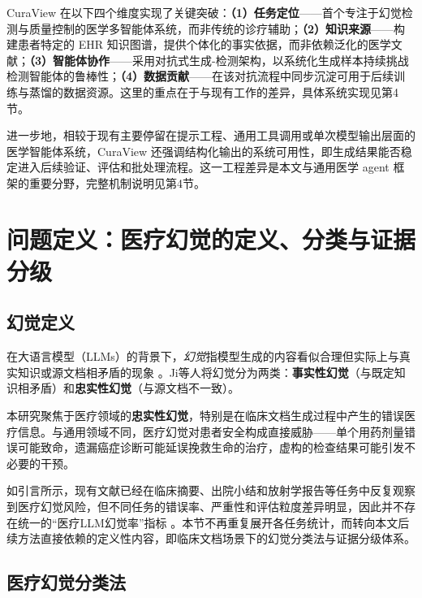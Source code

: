 \documentclass[11pt]{article}
\begin{document}
CuraView 在以下四个维度实现了关键突破：\textbf{（1）任务定位}------首个专注于幻觉检测与质量控制的医学多智能体系统，而非传统的诊疗辅助；\textbf{（2）知识来源}------构建患者特定的 EHR 知识图谱，提供个体化的事实依据，而非依赖泛化的医学文献；\textbf{（3）智能体协作}------采用对抗式生成-检测架构，以系统化生成样本持续挑战检测智能体的鲁棒性；\textbf{（4）数据贡献}------在该对抗流程中同步沉淀可用于后续训练与蒸馏的数据资源。这里的重点在于与现有工作的差异，具体系统实现见第4节。

进一步地，相较于现有主要停留在提示工程、通用工具调用或单次模型输出层面的医学智能体系统，CuraView 还强调结构化输出的系统可用性，即生成结果能否稳定进入后续验证、评估和批处理流程。这一工程差异是本文与通用医学 agent 框架的重要分野，完整机制说明见第4节。

\section{问题定义：医疗幻觉的定义、分类与证据分级}
\subsection{幻觉定义}

在大语言模型（LLMs）的背景下，\emph{幻觉}指模型生成的内容看似合理但实际上与真实知识或源文档相矛盾的现象 \citep{ji2023hallucinationSurvey}。Ji等人将幻觉分为两类：\textbf{事实性幻觉}（与既定知识相矛盾）和\textbf{忠实性幻觉}（与源文档不一致）。

本研究聚焦于医疗领域的\textbf{忠实性幻觉}，特别是在临床文档生成过程中产生的错误医疗信息。与通用领域不同，医疗幻觉对患者安全构成直接威胁------单个用药剂量错误可能致命，遗漏癌症诊断可能延误挽救生命的治疗，虚构的检查结果可能引发不必要的干预。

如引言所示，现有文献已经在临床摘要、出院小结和放射学报告等任务中反复观察到医疗幻觉风险，但不同任务的错误率、严重性和评估粒度差异明显，因此并不存在统一的``医疗LLM幻觉率''指标 \citep{pal2023medHalt,ji2023hallucinationSurvey,asgari2025clinicalSafetySummarisation,williams2025dischargeSummaries,artsi2025radiologyReview,zhang2024radFlag}。本节不再重复展开各任务统计，而转向本文后续方法直接依赖的定义性内容，即临床文档场景下的幻觉分类法与证据分级体系。

\subsection{医疗幻觉分类法}
\end{document}
